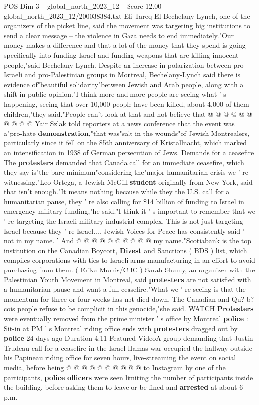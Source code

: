 \begin{textsample}{POS Dim 3 – global\_north\_2023\_12 – Score 12.00 – global\_north\_2023\_12/200038384.txt}
Eli Tareq El Bechelany-Lynch, one of the organizers of the picket line, said the movement was targeting big institutions to send a clear message -- the violence in Gaza needs to end immediately."Our money makes a difference and that a lot of the money that they spend is going specifically into funding Israel and funding weapons that are killing innocent people,"said Bechelany-Lynch.
Despite an increase in polarization between pro-Israeli and pro-Palestinian groups in Montreal, Bechelany-Lynch said there is evidence of"beautiful solidarity"between Jewish and Arab people, along with a shift in public opinion."I think more and more people are seeing what ' s happening, seeing that over 10,000 people have been killed, about 4,000 of them children,"they said."People can't look at that and not believe that @ @ @ @ @ @ @ @ @ @ Yair Szlak told reporters at a news conference that the event was a"pro-hate \textbf{demonstration},"that was"salt in the wounds"of Jewish Montrealers, particularly since it fell on the 85th anniversary of Kristallnacht, which marked an intensification in 1938 of German persecution of Jews.
Demands for a ceasefire The \textbf{protesters} demanded that Canada call for an immediate ceasefire, which they say is"the bare minimum"considering the"major humanitarian crisis we ' re witnessing."Leo Ortega, a Jewish McGill \textbf{student} originally from New York, said that isn't enough."It means nothing because while they the U.S. call for a humanitarian pause, they ' re also calling for \$14 billion of funding to Israel in emergency military funding,"he said."I think it ' s important to remember that we ' re targeting the Israeli military industrial complex.
This is not just targeting Israel because they ' re Israel....
Jewish Voices for Peace has consistently said ' not in my name. ' And @ @ @ @ @ @ @ @ @ @ my name."Scotiabank is the top institution on the Canadian Boycott, \textbf{Divest} and Sanctions ( BDS ) list, which compiles corporations with ties to Israeli arms manufacturing in an effort to avoid purchasing from them. ( Erika Morris/CBC ) Sarah Shamy, an organizer with the Palestinian Youth Movement in Montreal, said \textbf{protesters} are not satisfied with a humanitarian pause and want a full ceasefire."What we ' re seeing is that the momentum for three or four weeks has not died down.
The Canadian and Qu? b? cois people refuse to be complicit in this genocide,"she said.
WATCH \textbf{Protesters} were eventually removed from the prime minister ' s office by Montreal \textbf{police} : Sit-in at PM ' s Montreal riding office ends with \textbf{protesters} dragged out by \textbf{police} 24 days ago Duration 4:11 Featured VideoA group demanding that Justin Trudeau call for a ceasefire in the Israel-Hamas war occupied the hallway outside his Papineau riding office for seven hours, live-streaming the event on social media, before being @ @ @ @ @ @ @ @ @ @ to Instagram by one of the participants, \textbf{police} \textbf{officers} were seen limiting the number of participants inside the building, before asking them to leave or be fined and \textbf{arrested} at about 6 p.m.

\end{textsample}
